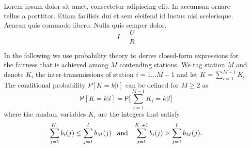 Lorem ipsum dolor sit amet, consectetur adipiscing elit. In accumsan ornare tellus a porttitor. Etiam facilisis dui et sem eleifend id luctus nisl scelerisque. Aenean quis commodo libero. Nulla quis semper dolor.
%
\begin{equation}
 I = \frac{U}{R}
\end{equation}

In the following we use probability theory to derive closed-form expressions for the fairness that is achieved among $M$ contending stations. We tag station $M$ and denote $K_i$ the inter-transmissions of station $i = 1 \dots M-1$ and let $K = \sum_{i=1}^{M-1} K_i$. The conditional probability $P[K\!=\!k|l]$ can be defined for $M \ge 2$ as
%
\begin{equation}
\mathsf{P}[K\!=\!k|l] = \mathsf{P} \Biggl[\sum_{i=1}^{M-1} K_i = k \Big| l \Biggr]
\label{eq:chapter03:exactpmf}
\end{equation}
%
where the random variables $K_i$ are the integers that satisfy
%
\begin{equation*}
\sum_{j=1}^{K_i} b_i(j) \le \sum_{j=1}^{l} b_M(j) \;\;\; \textmd{and} \;\;\; \sum_{j=1}^{K_i+1} b_i(j) > \sum_{j=1}^{l} b_M(j) .
\end{equation*}


%
%
